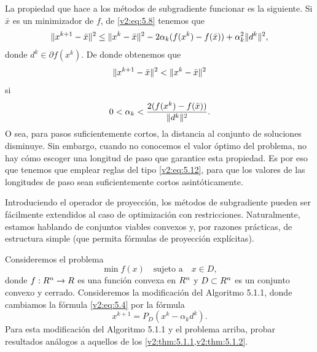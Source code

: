 La propiedad que hace a los métodos de subgradiente funcionar es la siguiente. Si $\bar{x}$ es un minimizador de $f$, de \eqref{v2:eq:5.8} tenemos que
\[
    \lVert x^{k+1} - \bar{x}\rVert^2 \le \lVert x^k - \bar{x}\rVert^2 - 2\alpha_k(f(x^k) - f(\bar{x})) + \alpha_k^2 \lVert d^k\rVert^2,
\]
donde $d^k \in \partial f(x^k)$. De donde obtenemos que
\[
    \lVert x^{k+1} - \bar{x}\rVert^2 < \lVert x^k - \bar{x}\rVert^2
\]
si
\[
    0 < \alpha_k < \frac{2(f(x^k) - f(\bar{x}))}{\lVert d^k\rVert^2}.
\]
O sea, para pasos suficientemente cortos, la distancia al conjunto de soluciones disminuye. Sin embargo, cuando no conocemos el valor óptimo del problema, no hay cómo escoger una longitud de paso que garantice esta propiedad. Es por eso que tenemos que emplear reglas del tipo \eqref{v2:eq:5.12}, para que los valores de las longitudes de paso sean suficientemente cortos asintóticamente.

Introduciendo el operador de proyección, los métodos de subgradiente pueden ser fácilmente extendidos al caso de optimización con restricciones. Naturalmente, estamos hablando de conjuntos viables convexos y, por razones prácticas, de estructura simple (que permita fórmulas de proyección explícitas).

\begin{exercise}\label{v2:ejer:5.1.1}
    Consideremos el problema
    \[
        \min f(x) \quad \text{sujeto a} \quad x \in D,
    \]
    donde $f : R^n \to R$ es una función convexa en $R^n$ y $D \subset R^n$ es un conjunto convexo y cerrado. Consideremos la modificación del Algoritmo 5.1.1, donde cambiamos la fórmula \eqref{v2:eq:5.4} por la fórmula
    \[
        x^{k+1} = P_D(x^k - \alpha_k d^k).
    \]
    Para esta modificación del Algoritmo 5.1.1 y el problema arriba, probar resultados análogos a aquellos de los \cref{v2:thm:5.1.1,v2:thm:5.1.2}.
\end{exercise}

